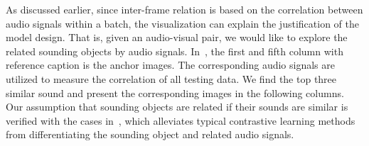 As discussed earlier, since inter-frame relation is based on the correlation between audio signals within a batch, the visualization can explain the justification of the model design.
% 
That is, given an audio-visual pair, we would like to explore the related sounding objects by audio signals.
% 
In~, the first and fifth column with reference caption is the anchor images. The corresponding audio signals are utilized to measure the correlation of all testing data.
% 
We find the top three similar sound and present the corresponding images in the following columns.
% 
Our assumption that sounding objects are related if their sounds are similar is verified with the cases in~, which alleviates typical contrastive learning methods from differentiating the sounding object and related audio signals.
% 










